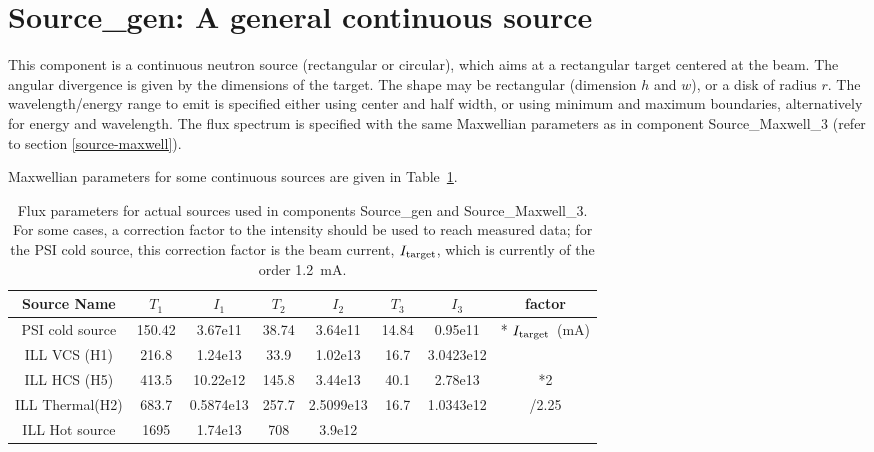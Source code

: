 \section{Source\_gen: A general continuous source}
\label{source-gen}


This component is a continuous neutron source (rectangular or circular), which aims at
a rectangular target centered at the beam.
The angular divergence is given by the dimensions of the target.
The shape may be rectangular (dimension $h$ and $w$), or a disk of radius $r$.
The wavelength/energy range to emit is specified either using center and half width, or using minimum and maximum boundaries, alternatively for energy and wavelength.
The flux spectrum is specified with the same Maxwellian parameters as in component Source\_Maxwell\_3 (refer to section \ref{source-maxwell}).

Maxwellian parameters for some continuous sources
are given in Table~\ref{t:source-params}.

\begin{table}
  \begin{center}
  {\let\my=\\
    \begin{tabular}{|c|cccccc|c|}
    \hline
    Source Name & $T_1$ & $I_1$ & $T_2$ & $I_2$ & $T_3$ & $I_3$ & factor \\
    \hline
    PSI cold source & 150.42 & 3.67e11   & 38.74 & 3.64e11    & 14.84& 0.95e11    & * $I_{\rm target}$~(mA)\\
    ILL VCS (H1)    & 216.8  & 1.24e13   & 33.9  & 1.02e13    & 16.7 & 3.0423e12  &\\
    ILL HCS (H5)    & 413.5  & 10.22e12  & 145.8 & 3.44e13    & 40.1 & 2.78e13    & *2\\
    ILL Thermal(H2) & 683.7  & 0.5874e13 & 257.7 & 2.5099e13  & 16.7 & 1.0343e12  & /2.25\\
    ILL Hot source  & 1695   & 1.74e13   & 708   & 3.9e12     &      &            &\\ \hline
    \end{tabular}
    \caption{Flux parameters for actual sources used in components
             Source\_gen and Source\_Maxwell\_3.
             For some cases, a correction factor to the intensity
             should be used to reach measured data; for the PSI cold source,
             this correction factor is the beam current, $I_{\rm target}$,
             which is currently of the order 1.2~mA.
}
    \label{t:source-params}
  }
  \end{center}
\end{table}